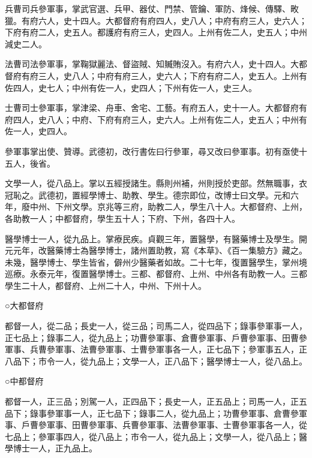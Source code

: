 \begin{pinyinscope}
 兵曹司兵參軍事，掌武官選、兵甲、器仗、門禁、管鑰、軍防、烽候、傳驛、畋獵。有府六人，史十四人。大都督府有府四人，史八人；中府有府三人，史六人；下府有府二人，史五人。都護府有府三人，史四人。上州有佐二人，史五人；中州減史二人。



 法曹司法參軍事，掌鞠獄麗法、督盜賊、知贓賄沒入。有府六人，史十四人。大都督府有府三人，史八人；中府有府三人，史六人；下府有府二人，史五人。上州有佐四人，史七人；中州有佐一人，史四人；下州有佐一人，史三人。



 士曹司士參軍事，掌津梁、舟車、舍宅、工藝。有府五人，史十一人。大都督府有府四人，史八人；中府、下府有府三人，史六人。上州有佐二人，史五人；中州有佐一人，史四人。



 參軍事掌出使、贊導。武德初，改行書佐曰行參軍，尋又改曰參軍事。初有亟使十五人，後省。



 文學一人，從八品上。掌以五經授諸生。縣則州補，州則授於吏部。然無職事，衣冠恥之。武德初，置經學博士、助教、學生。德宗即位，改博士曰文學。元和六年，廢中州、下州文學。京兆等三府，助教二人，學生八十人。大都督府、上州，各助教一人；中都督府，學生五十人；下府、下州，各四十人。



 醫學博士一人，從九品上。掌療民疾。貞觀三年，置醫學，有醫藥博士及學生。開元元年，改醫藥博士為醫學博士，諸州置助教，寫《本草》、《百一集驗方》藏之。未幾，醫學博士、學生皆省，僻州少醫藥者如故。二十七年，復置醫學生，掌州境巡療。永泰元年，復置醫學博士。三都、都督府、上州、中州各有助教一人。三都學生二十人，都督府、上州二十人，中州、下州十人。



 ○大都督府



 都督一人，從二品；長史一人，從三品；司馬二人，從四品下；錄事參軍事一人，正七品上；錄事二人，從九品上；功曹參軍事、倉曹參軍事、戶曹參軍事、田曹參軍事、兵曹參軍事、法曹參軍事、士曹參軍事各一人，正七品下；參軍事五人，正八品下；市令一人，從九品上；文學一人，正八品下；醫學博士一人，從八品上。



 ○中都督府



 都督一人，正三品；別駕一人，正四品下；長史一人，正五品上；司馬一人，正五品下；錄事參軍事一人，正七品下；錄事二人，從九品上；功曹參軍事、倉曹參軍事、戶曹參軍事、田曹參軍事、兵曹參軍事、法曹參軍事、士曹參軍事各一人，從七品上；參軍事四人，從八品上；市令一人，從九品上；文學一人，從八品上；醫學博士一人，正九品上。




\end{pinyinscope}
